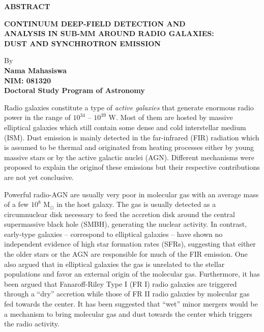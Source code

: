 \begin{center}
\textbf{ABSTRACT}

\vspace{0.5cm}

\textbf{CONTINUUM DEEP-FIELD DETECTION AND \\ ANALYSIS IN SUB-MM AROUND RADIO GALAXIES: \\ DUST AND SYNCHROTRON EMISSION}\\
\vspace{0.5cm}

By\\
\textbf{Nama Mahasiswa\\
NIM: 081320\\
Doctoral Study Program of Astronomy}\\
\end{center}

\vspace{1.0cm}
\restoreparskip
Radio galaxies constitute a type of \textit{active galaxies} that generate enormous radio power in the range of $10^{34}$ -- $10^{39}$ W. Most of them are hosted by  massive elliptical galaxies which still contain some dense and cold interstellar medium (ISM). Dust emission is mainly detected in the far-infrared (FIR) radiation which is assumed to be thermal and originated from heating processes either by young massive stars or by the active galactic nuclei (AGN). Different mechanisms were proposed to explain the originof these emissions but their respective contributions are not yet conclusive.

Powerful radio-AGN are usually very poor in molecular gas with an average mass of a few $10^8$ M$_\odot$ in the host galaxy. The gas is usually detected as a circumnuclear disk necessary to feed the accretion disk around the central supermassive black hole (SMBH), generating the nuclear activity. In contrast, early-type galaxies -- correspond to elliptical galaxies -- have shown no independent evidence of high star formation rates (SFRs), suggesting that either the older stars or the AGN are responsible for much of the FIR emission. One also argued that in  elliptical galaxies the gas is unrelated to the stellar populations and favor an external origin of the molecular gas. Furthermore, it has been argued that Fanaroff-Riley Type I (FR I) radio galaxies are triggered through a ``dry'' accretion while those of FR II radio galaxies by molecular gas fed towards the center. It has been suggested that ``wet''  minor mergers would be a mechanism to bring molecular gas and dust towards the center which triggers the radio activity.

